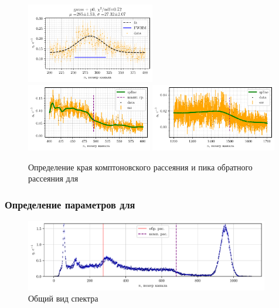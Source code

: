 \begin{figure}[h!]
    \centering
    \includegraphics[width=0.5\textwidth]{figures/na_bp1.pdf}
    \\
    \vspace{-2mm}
    \includegraphics[width=0.49\textwidth]{figures/na_comp1.pdf}
    \includegraphics[width=0.49\textwidth]{figures/na_comp2.pdf}
    \vspace{-2mm}
    \caption{Определение края комптоновского рассеяния и пика обратного рассеяния для \na}
\end{figure}

\newpage


\subsubsection*{Определение параметров для \cs}

\begin{figure}[h!]
    \centering
    \includegraphics[width=0.95\textwidth]{figures/cs_0.pdf}
    \vspace{-2mm}
    \caption{Общий вид спектра \cs}
\end{figure}



